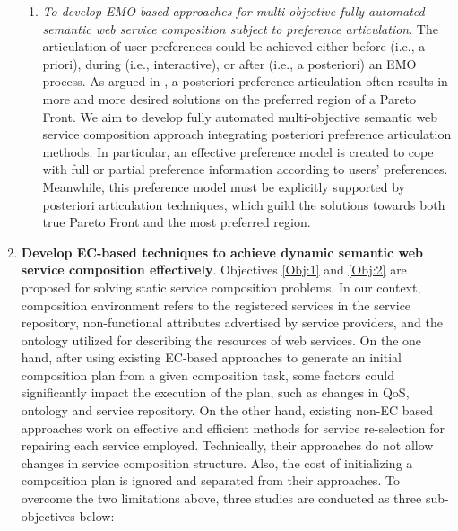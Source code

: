 \begin{enumerate}
\begin{enumerate}
    \item \emph{To develop EMO-based approaches for multi-objective fully automated semantic web service composition subject to preference articulation}.  The articulation of user preferences could be achieved either before (i.e., a priori), during (i.e., interactive), or after (i.e., a posteriori) an EMO process. As argued in \cite{giagkiozis2014pareto}, a posteriori preference articulation often results in more and more desired solutions on the preferred region of a Pareto Front. We aim to develop fully automated multi-objective semantic web service composition approach integrating posteriori preference articulation methods. In particular, an effective preference model is created to cope with full or partial preference information according to users' preferences. Meanwhile, this preference model must be explicitly supported by posteriori articulation techniques,  which guild the solutions towards both true Pareto Front and the most preferred region. 

   \end{enumerate}
   
\vspace{0.5cm}
 \item \textbf{Develop EC-based techniques to achieve dynamic semantic web service composition effectively}. Objectives \ref{Obj:1} and \ref{Obj:2} are proposed for solving static service composition problems. In our context, composition environment refers to the registered services in the service repository, non-functional attributes advertised by service providers, and the ontology utilized for describing the resources of web services. On the one hand, after using existing EC-based approaches to generate an initial composition plan from a given composition task, some factors could significantly impact the execution of the plan, such as changes in QoS, ontology and service repository. On the other hand, existing non-EC based approaches \cite{nasridinov2012qos,salas2006ws,wagner2016robust,yin2010qos} work on effective and efficient methods for service re-selection for repairing each service employed. Technically, their approaches do not allow changes in service composition structure. Also, the cost of initializing a composition plan is ignored and separated from their approaches. To overcome the two limitations above, three studies are conducted as three sub-objectives below:


\end{enumerate}
